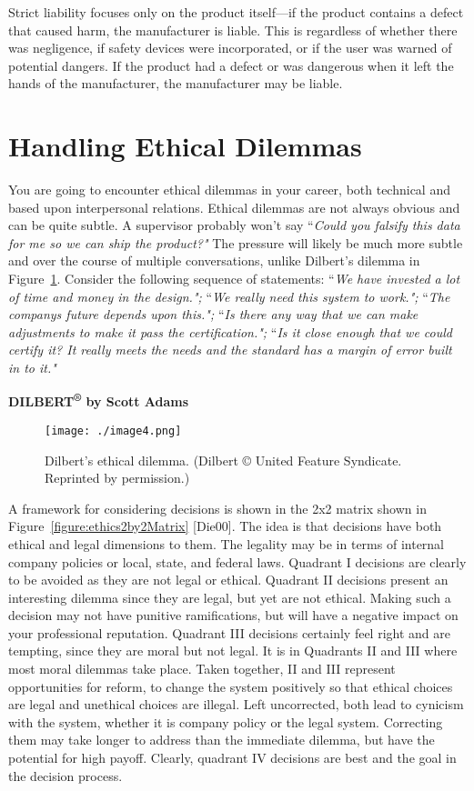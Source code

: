 Strict liability focuses only on the product itself---if the product
contains a defect that caused harm, the manufacturer is liable. This is
regardless of whether there was negligence, if safety devices were
incorporated, or if the user was warned of potential dangers. If the
product had a defect or was dangerous when it left the hands of the
manufacturer, the manufacturer may be liable.

\section{Handling Ethical Dilemmas}
\label{section:handling-ethical-dilemmas}

You are going to encounter ethical dilemmas in your career, both
technical and based upon interpersonal relations. Ethical dilemmas are
not always obvious and can be quite subtle. A supervisor probably won't
say ``\emph{Could you falsify this data for me so we can ship the
product?"} The pressure will likely be much more subtle and over the
course of multiple conversations, unlike Dilbert's dilemma in 
Figure~\ref{figure:dilberEthics}. 
Consider the following sequence of statements: ``\emph{We have
invested a lot of time and money in the design.";} ``\emph{We really
need this system to work.";} ``\emph{The company\textquotesingle s
future depends upon this.";} ``\emph{Is there any way that we can make
adjustments to make it pass the certification.";} ``\emph{Is it close
enough that we could certify it? It really meets the needs and the
standard has a margin of error built in to it."}

\textbf{DILBERT\textsuperscript{®} by Scott Adams}
\begin{figure}[h]
\centering
\texttt{[image: ./image4.png]}
\caption{Dilbert's ethical dilemma. (Dilbert © United
Feature Syndicate. Reprinted by permission.)}
\label{figure:dilberEthics}
\end{figure}


A framework for considering decisions is shown in the 2x2 matrix shown
in Figure~\ref{figure:ethics2by2Matrix} {[}Die00{]}. The idea is that decisions have both ethical
and legal dimensions to them. The legality may be in terms of internal
company policies or local, state, and federal laws. Quadrant I decisions
are clearly to be avoided as they are not legal or ethical. Quadrant II
decisions present an interesting dilemma since they are legal, but yet
are not ethical. Making such a decision may not have punitive
ramifications, but will have a negative impact on your professional
reputation. Quadrant III decisions certainly feel right and are
tempting, since they are moral but not legal. It is in Quadrants II and
III where most moral dilemmas take place. Taken together, II and III
represent opportunities for reform, to change the system positively so
that ethical choices are legal and unethical choices are illegal. Left
uncorrected, both lead to cynicism with the system, whether it is
company policy or the legal system. Correcting them may take longer to
address than the immediate dilemma, but have the potential for high
payoff. Clearly, quadrant IV decisions are best and the goal in the
decision process.

